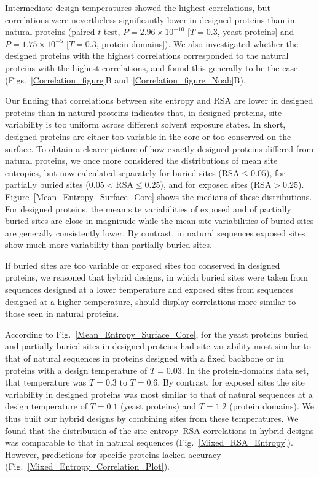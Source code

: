\documentclass[12pt]{article}
\begin{document}
Intermediate design temperatures showed the highest correlations, but correlations were nevertheless significantly lower in designed proteins than in natural proteins (paired $t$ test, $P=2.96\times 10^{-10}$ [$T=0.3$, yeast proteins] and $P= 1.75\times 10^{-5}$ [$T=0.3$, protein domains]).  We also investigated whether the designed proteins with the highest correlations corresponded to the natural proteins with the highest correlations, and found this generally to be the case (Figs.~\ref{Correlation_figure}B and~\ref{Correlation_figure_Noah}B).

Our finding that correlations between site entropy and RSA are lower in designed proteins than in natural proteins indicates that, in designed proteins, site variability is too uniform across different solvent exposure states. In short, designed proteins are either too variable in the core or too conserved on the surface. To obtain a clearer picture of how exactly designed proteins differed from natural proteins, we once more considered the distributions of mean site entropies, but now calculated separately for buried sites ($\text{RSA}\leq0.05$), for partially buried sites ($0.05<\text{RSA}\leq0.25$), and for exposed sites ($\text{RSA}>0.25$). Figure~\ref{Mean_Entropy_Surface_Core} shows the medians of these distributions. For designed proteins, the mean site variabilities of exposed and of partially buried sites are close in magnitude while the mean site variabilities of buried sites are generally consistently lower. By contrast, in natural sequences exposed sites show much more variability than partially buried sites.

If buried sites are too variable or exposed sites too conserved in designed proteins, we reasoned that hybrid designs, in which buried sites were taken from sequences designed at a lower temperature and exposed sites from sequences designed at a higher temperature, should display correlations more similar to those seen in natural proteins. 

According to Fig.~\ref{Mean_Entropy_Surface_Core}, for the yeast proteins buried and partially buried sites in designed proteins had site variability most similar to that of natural sequences in proteins designed with a fixed backbone or in proteins with a design temperature of $T=0.03$. In the protein-domains data set, that temperature was $T=0.3$ to $T = 0.6$.  By contrast, for exposed sites the site variability in designed proteins was most similar to that of natural sequences at a design temperature of $T= 0.1$ (yeast proteins) and $T  = 1.2$ (protein domains).  We thus built our hybrid designs by combining sites from these temperatures. We found that the distribution of the site-entropy--RSA correlations in hybrid designs was comparable to that in natural sequences (Fig.~\ref{Mixed_RSA_Entropy}). However, predictions for specific proteins lacked accuracy (Fig.~\ref{Mixed_Entropy_Correlation_Plot}).
\end{document}
